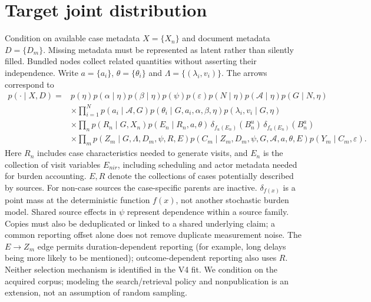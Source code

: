 \documentclass[11pt]{article}
\begin{document}
\section{Target joint distribution}
Condition on available case metadata $X=\{X_n\}$ and document metadata
$D=\{D_m\}$. Missing metadata must be represented as latent rather than silently
filled. Bundled nodes collect related quantities without asserting their
independence. Write $a=\{a_i\}$, $\theta=\{\theta_i\}$ and
$\Lambda=\{(\lambda_i,v_i)\}$. The arrows correspond to
\begin{align*}
p(\cdot\mid X,D)={}&p(\eta)p(\alpha\mid\eta)p(\beta\mid\eta)p(\psi)p(\varepsilon)
 p(N\mid\eta)p(\mathcal A\mid\eta)p(G\mid N,\eta)\\
&\times\prod_{i=1}^{N}p(a_i\mid\mathcal A,G)
 p(\theta_i\mid G,a_i,\alpha,\beta,\eta)p(\lambda_i,v_i\mid G,\eta)\\
&\times\prod_n p(R_n\mid G,X_n)
 p(E_n\mid R_n,a,\theta)\,
 \delta_{f_u(E_n)}(B_n^u)\,
 \delta_{f_a(E_n)}(B_n^a)\\
&\times\prod_m p(Z_m\mid G,\Lambda,D_m,\psi,R,E)
 p(C_m\mid Z_m,D_m,\psi,G,\mathcal A,a,\theta,E)
 p(Y_m\mid C_m,\varepsilon).
\end{align*}
Here $R_n$ includes case characteristics needed to generate visits, and $E_n$
is the collection of visit variables $E_{nir}$, including scheduling and actor
metadata needed for burden accounting. $E,R$ denote the
collections of cases potentially described by sources. For non-case sources
the case-specific parents are inactive. $\delta_{f(x)}$ is a point mass at the
deterministic function $f(x)$, not another stochastic burden model. Shared
source effects in $\psi$ represent dependence within a source family. Copies
must also be deduplicated or linked to a shared underlying claim; a common
reporting offset alone does not remove duplicate measurement noise. The
$E\to Z_m$ edge permits duration-dependent reporting (for example,
long delays being more likely to be mentioned); outcome-dependent reporting also
uses $R$. Neither selection mechanism is identified in the V4 fit.
We condition on the acquired corpus; modeling the search/retrieval
policy and nonpublication is an extension, not an assumption of random sampling.
\end{document}
